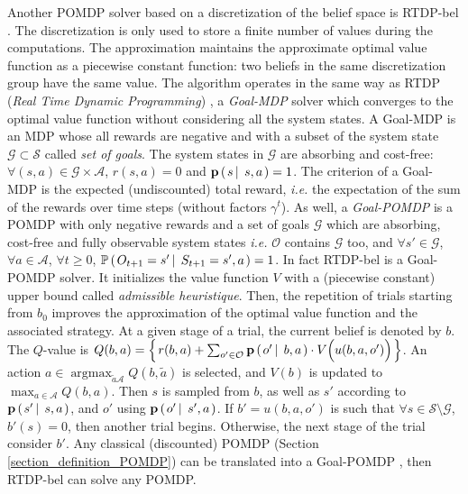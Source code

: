 Another POMDP solver based on a discretization of the belief space is RTDP-bel \cite{Geffner98solvinglarge}.
The discretization is only used to store a finite number of values during the computations.
The approximation maintains the approximate optimal value function as a piecewise constant function:
two beliefs in the same discretization group have the same value.
The algorithm operates in the same way as RTDP (\textit{Real Time Dynamic Programming}) \cite{Barto93learningto},
a \textit{Goal-MDP} solver which converges to the optimal value function without considering all the system states.
A Goal-MDP \cite{Bertsekas:2000:DPO:517430} is an MDP 
whose all rewards are negative and with a subset of the system state $\mathcal{G} \subset \mathcal{S}$
called \textit{set of goals}. The system states in $\mathcal{G}$ are absorbing and cost-free: 
$\forall (s,a) \in \mathcal{G} \times \mathcal{A}$,
$r(s,a)=0$ and $\textbf{p} \left( \left. s \, \right| \left. \, s,a \right. \right) = 1$.
The criterion of a Goal-MDP is the expected (undiscounted) total reward,
\textit{i.e.} the expectation of the sum of the rewards over time steps (without factors $\gamma^t$).
As well, a \textit{Goal-POMDP} is a POMDP with only negative rewards
and a set of goals $\mathcal{G}$ which are  absorbing, cost-free and fully observable system states \textit{i.e.}
$\mathcal{O}$ contains $\mathcal{G}$ too, 
and $\forall s' \in \mathcal{G}$, $\forall a \in \mathcal{A}$, $\forall t \geqslant 0$,
$\mathbb{P} \left( \left.  O_{t+1} = s' \, \right| \left. \, S_{t+1} = s', a   \right. \right) = 1$.
In fact RTDP-bel is a Goal-POMDP solver.
It initializes the value function $V$ with a (piecewise constant) upper bound called \textit{admissible heuristique}.
Then, the repetition of trials starting from $b_0$ improves the approximation of the optimal value function and the associated strategy.
At a given stage of a trial, the current belief is denoted by $b$. 
The $Q$-value is $Q(b,a) = \left\{ \left.  r(b,a) + \sum_{o' \in \mathcal{O}} \textbf{p} \left( \left.  o' \, \right| \left. \, b, a   \right. \right) \cdot V \Big( u(b,a,o') \Big)  \right. \right\}$.
An action $a \in \operatorname*{argmax}_{\tilde{a} \mathcal{A}} Q(b,\tilde{a})$
is selected, and $V(b)$ is updated to $\max_{a \in \mathcal{A}} Q(b,a)$.
Then $s$ is sampled from $b$, as well as $s'$ according to $\textbf{p} \left( \left.  s' \, \right| \left. \, s,a  \right. \right)$, 
and $o'$ using $\textbf{p} \left( \left.  o' \, \right| \left. \, s',a  \right. \right)$.
If $b'=u(b,a,o')$ is such that $\forall s \in \mathcal{S}\setminus\mathcal{G}$, 
$b'(s)=0$, then another trial begins. Otherwise, the next stage of the trial consider $b'$.
Any classical (discounted) POMDP (Section \ref{section_definition_POMDP})
can be translated into a Goal-POMDP \cite{DBLP:conf/ijcai/BonetG09},
then RTDP-bel can solve any POMDP.

